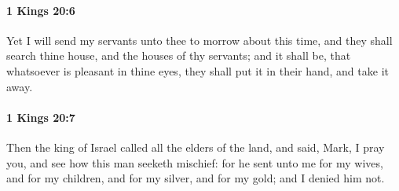 		\paragraph{1 Kings 20:6} %
			\label{1KINGS-20-6}

			Yet I will send my servants unto thee to morrow about this time, and they shall search thine house, and the houses of thy servants; and it shall be, that whatsoever is pleasant in thine eyes, they shall put it in their hand, and take it away.


		\paragraph{1 Kings 20:7} %
			\label{1KINGS-20-7}

			Then the king of Israel called all the elders of the land, and said, Mark, I pray you, and see how this man seeketh mischief: for he sent unto me for my wives, and for my children, and for my silver, and for my gold; and I denied him not.

